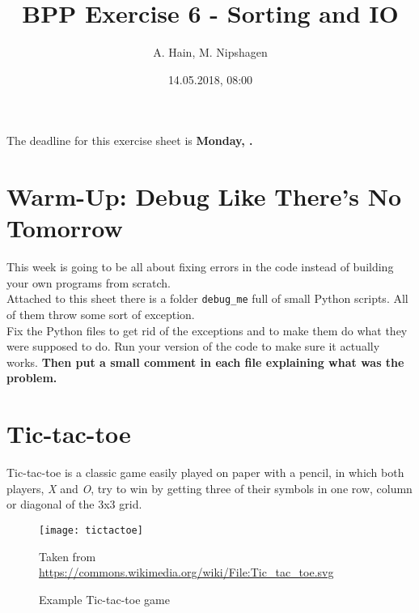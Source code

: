 
\usepackage{tikz}
\usetikzlibrary{arrows,automata}

\title{BPP Exercise 6 - Sorting and IO}
\author{A. Hain, M. Nipshagen}
\date{14.05.2018, 08:00}

\makeatletter
\let\thetitle\@title
\let\theauthor\@author
\let\thedate\@date
\makeatother





The deadline for this exercise sheet is \textbf{Monday, \thedate.}
%
%

\section{Warm-Up: Debug Like There's No Tomorrow}

This week is going to be all about fixing errors in the code instead of
building your own programs from scratch.\\
Attached to this sheet there is a folder \texttt{debug\_me} full of small
Python scripts. All of them throw some sort of exception.\\
Fix the Python files to get rid of the exceptions and to make them do what
they were supposed to do. Run your version of the code to make sure it
actually works.
\textbf{Then put a small comment in each file explaining what was the problem.}\\

\section{Tic-tac-toe}

Tic-tac-toe is a classic game easily played on paper with a pencil, in
which both players, \textit{X} and \textit{O}, try to win by getting three
of their symbols in one row, column or diagonal of the 3x3 grid.

\begin{figure}[h]
\centering
\texttt{[image: tictactoe]}
\label{fig:Tic-tac-toe}
\caption{Example Tic-tac-toe game}
\small{Taken from \url{https://commons.wikimedia.org/wiki/File:Tic_tac_toe.svg}}
\end{figure}

